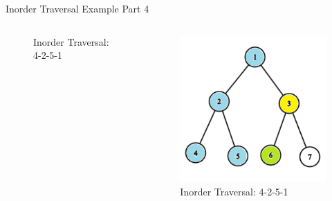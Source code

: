 \documentclass[aspectratio=169]{beamer}%
\begin{document}
\begin{frame}{Inorder Traversal Example Part 4}
\begin{columns}
\begin{column}{0.32\textwidth}
\begin{figure}
                \caption{Inorder Traversal: 4-2-5-1}
            \end{figure}
        \end{column}
        \hfill
        \begin{column}{0.32\textwidth}
            \begin{figure}
                \centering
                \includegraphics[width = .9\linewidth]{tree-in 12.png}
                \caption{Inorder Traversal: 4-2-5-1}
            \end{figure}
        \end{column}
    \end{columns}
\end{frame}
\end{document}

